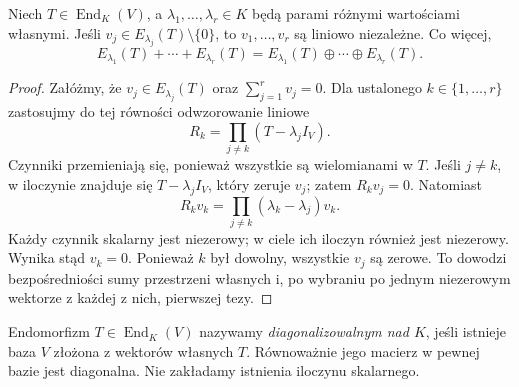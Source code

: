 \begin{twierdzenie}
\label{thm:lin14-eigen-independence}
Niech \(T\in\operatorname{End}_K(V)\),
a \(\lambda_1,\ldots,\lambda_r\in K\)
będą parami różnymi wartościami własnymi.
Jeśli \(v_j\in E_{\lambda_j}(T)\setminus\{0\}\),
to \(v_1,\ldots,v_r\) są liniowo niezależne.
Co więcej,
\[
 E_{\lambda_1}(T)+\cdots+
 E_{\lambda_r}(T)
 =
 E_{\lambda_1}(T)\oplus\cdots\oplus
 E_{\lambda_r}(T).
\]
\end{twierdzenie}
\begin{proof}
Załóżmy, że
\(v_j\in E_{\lambda_j}(T)\)
oraz \(\sum_{j=1}^rv_j=0\).
Dla ustalonego \(k\in\{1,\ldots,r\}\)
zastosujmy do tej równości
odwzorowanie liniowe
\[
 R_k=\prod_{j\ne k}(T-\lambda_jI_V).
\]
Czynniki przemieniają się, ponieważ
wszystkie są wielomianami w \(T\).
Jeśli \(j\ne k\), w iloczynie znajduje się
\(T-\lambda_jI_V\), który zeruje \(v_j\);
zatem \(R_kv_j=0\).
Natomiast
\[
 R_kv_k=
 \prod_{j\ne k}(\lambda_k-\lambda_j)v_k.
\]
Każdy czynnik skalarny jest niezerowy;
w ciele ich iloczyn również jest niezerowy.
Wynika stąd \(v_k=0\).
Ponieważ \(k\) był dowolny,
wszystkie \(v_j\) są zerowe.
To dowodzi bezpośredniości sumy
przestrzeni własnych i, po wybraniu
po jednym niezerowym wektorze z każdej
z nich, pierwszej tezy.
\end{proof}

\begin{definicja}
\label{def:lin14-diagonalizable}
Endomorfizm \(T\in\operatorname{End}_K(V)\)
nazywamy \emph{diagonalizowalnym nad \(K\)},
jeśli istnieje baza \(V\)
złożona z wektorów własnych \(T\).
Równoważnie jego macierz
w pewnej bazie jest diagonalna.
Nie zakładamy istnienia
iloczynu skalarnego.
\end{definicja}

